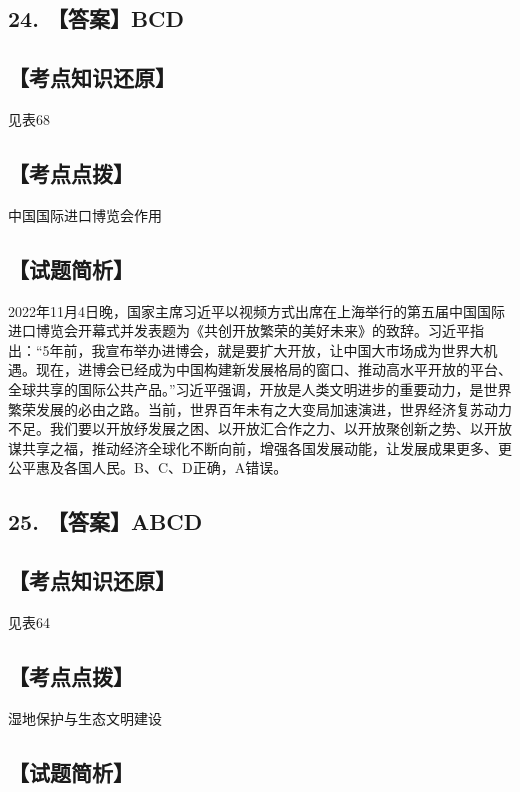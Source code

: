 \documentclass[UTF8,11pt]{ctexart}
\begin{document}
\subsection*{24. 【答案】BCD}

\subsection*{【考点知识还原】}

见表68


\subsection*{【考点点拨】}

中国国际进口博览会作用


\subsection*{【试题简析】}

2022年11月4日晚，国家主席习近平以视频方式出席在上海举行的第五届中国国际进口博览会开幕式并发表题为《共创开放繁荣的美好未来》的致辞。习近平指出：“5年前，我宣布举办进博会，就是要扩大开放，让中国大市场成为世界大机遇。现在，进博会已经成为中国构建新发展格局的窗口、推动高水平开放的平台、全球共享的国际公共产品。”习近平强调，开放是人类文明进步的重要动力，是世界繁荣发展的必由之路。当前，世界百年未有之大变局加速演进，世界经济复苏动力不足。我们要以开放纾发展之困、以开放汇合作之力、以开放聚创新之势、以开放谋共享之福，推动经济全球化不断向前，增强各国发展动能，让发展成果更多、更公平惠及各国人民。B、C、D正确，A错误。


\subsection*{25. 【答案】ABCD}

\subsection*{【考点知识还原】}

见表64


\subsection*{【考点点拨】}

湿地保护与生态文明建设


\subsection*{【试题简析】}
\end{document}
